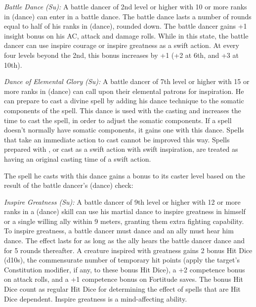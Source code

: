 {\textit{Battle Dance (Su):} A battle dancer of 2nd level or higher with 10 or more ranks in  (dance) can enter in a battle dance. The battle dance lasts a number of rounds equal to half of his ranks in  (dance), rounded down. The battle dancer gains +1 insight bonus on his AC, attack and damage rolls. While in this state, the battle dancer can use inspire courage or inspire greatness as a swift action. At every four levels beyond the 2nd, this bonus increases by +1 (+2 at 6th, and +3 at 10th).

\textit{Dance of Elemental Glory (Su):} A battle dancer of 7th level or higher with 15 or more ranks in  (dance) can call upon their elemental patrons for inspiration. He can prepare to cast a divine spell by adding his dance technique to the somatic components of the spell. This dance is used with the casting and increases the time to cast the spell, in order to adjust the somatic components. If a spell doesn't normally have somatic components, it gains one with this dance. Spells that take an immediate action to cast cannot be improved this way. Spells prepared with , or cast as a swift action with swift inspiration, are treated as having an original casting time of a swift action.


The spell he casts with this dance gains a bonus to its caster level based on the result of the battle dancer's  (dance) check:


\textit{Inspire Greatness (Su):} A battle dancer of 9th level or higher with 12 or more ranks in a  (dance) skill can use his martial dance to inspire greatness in himself or a single willing ally within 9 meters, granting them extra fighting capability. To inspire greatness, a battle dancer must dance and an ally must hear him dance. The effect lasts for as long as the ally hears the battle dancer dance and for 5 rounds thereafter. A creature inspired with greatness gains 2 bonus Hit Dice (d10s), the commensurate number of temporary hit points (apply the target's Constitution modifier, if any, to these bonus Hit Dice), a +2 competence bonus on attack rolls, and a +1 competence bonus on Fortitude saves. The bonus Hit Dice count as regular Hit Dice for determining the effect of spells that are Hit Dice dependent. Inspire greatness is a mind-affecting ability.

}
